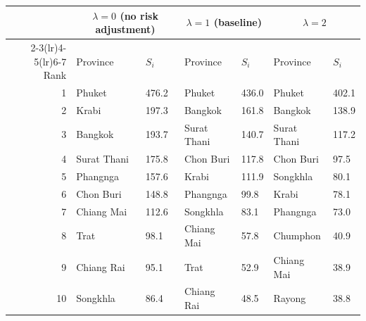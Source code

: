 \begin{tabular}{rllllll}
\toprule
 & \multicolumn{2}{c}{$\lambda=0$ (no risk adjustment)} & \multicolumn{2}{c}{$\lambda=1$ (baseline)} & \multicolumn{2}{c}{$\lambda=2$} \\
\cmidrule(lr){2-3}\cmidrule(lr){4-5}\cmidrule(lr){6-7}
Rank & Province & $S_i$ & Province & $S_i$ & Province & $S_i$ \\
\midrule
1 & Phuket & 476.2 & Phuket & 436.0 & Phuket & 402.1 \\
2 & Krabi & 197.3 & Bangkok & 161.8 & Bangkok & 138.9 \\
3 & Bangkok & 193.7 & Surat Thani & 140.7 & Surat Thani & 117.2 \\
4 & Surat Thani & 175.8 & Chon Buri & 117.8 & Chon Buri & 97.5 \\
5 & Phangnga & 157.6 & Krabi & 111.9 & Songkhla & 80.1 \\
6 & Chon Buri & 148.8 & Phangnga & 99.8 & Krabi & 78.1 \\
7 & Chiang Mai & 112.6 & Songkhla & 83.1 & Phangnga & 73.0 \\
8 & Trat & 98.1 & Chiang Mai & 57.8 & Chumphon & 40.9 \\
9 & Chiang Rai & 95.1 & Trat & 52.9 & Chiang Mai & 38.9 \\
10 & Songkhla & 86.4 & Chiang Rai & 48.5 & Rayong & 38.8 \\
\bottomrule
\end{tabular}
